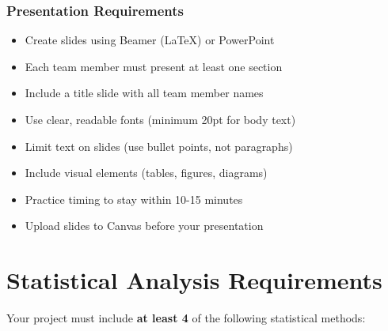 \documentclass[11pt]{article}
\begin{document}
\subsubsection{Presentation Requirements}

\begin{itemize}
\item Create slides using Beamer (LaTeX) or PowerPoint
\item Each team member must present at least one section
\item Include a title slide with all team member names
\item Use clear, readable fonts (minimum 20pt for body text)
\item Limit text on slides (use bullet points, not paragraphs)
\item Include visual elements (tables, figures, diagrams)
\item Practice timing to stay within 10-15 minutes
\item Upload slides to Canvas before your presentation
\end{itemize}

\section{Statistical Analysis Requirements}

Your project must include \textbf{at least 4} of the following statistical methods:
\end{document}
